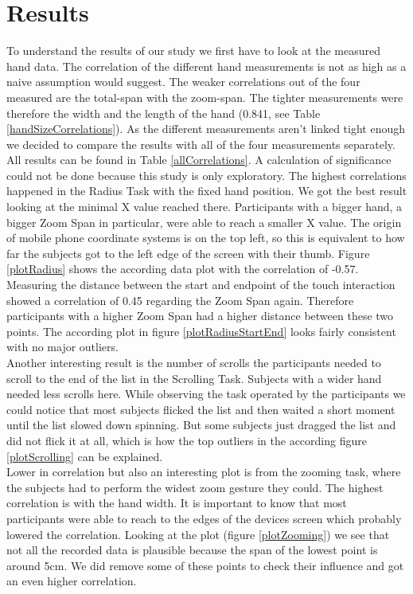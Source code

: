 \documentclass{sigchi}
\begin{document}
\section{Results}
To understand the results of our study we first have to look at the measured hand data. The correlation of the different hand measurements is not as high as a naive assumption would suggest. The weaker correlations out of the four measured are the total-span with the zoom-span. The tighter measurements were therefore the width and the length of the hand (0.841, see Table \ref{handSizeCorrelations}). As the different measurements aren't linked tight enough we decided to compare the results with all of the four measurements separately. All results can be found in Table \ref{allCorrelations}. A calculation of significance could not be done because this study is only exploratory. The highest correlations happened in the Radius Task with the fixed hand position. We got the best result looking at the minimal X value reached there. Participants with a bigger hand, a bigger Zoom Span in particular, were able to reach a smaller X value. The origin of mobile phone coordinate systems is on the top left, so this is equivalent to how far the subjects got to the left edge of the screen with their thumb. Figure \ref{plotRadius} shows the according data plot with the correlation of -0.57. Measuring the distance between the start and endpoint of the touch interaction showed a correlation of 0.45 regarding the Zoom Span again. Therefore participants with a higher Zoom Span had a higher distance between these two points. The according plot in figure \ref{plotRadiusStartEnd} looks fairly consistent with no major outliers.\\
Another interesting result is the number of scrolls the participants needed to scroll to the end of the list in the Scrolling Task. Subjects with a wider hand needed less scrolls here. While observing the task operated by the participants we could notice that most subjects flicked the list and then waited a short moment until the list slowed down spinning. But some subjects just dragged the list and did not flick it at all, which is how the top outliers in the according figure \ref{plotScrolling} can be explained.\\
Lower in correlation but also an interesting plot is from the zooming task, where the subjects had to perform the widest zoom gesture they could. The highest correlation is with the hand width. It is important to know that most participants were able to reach to the edges of the devices screen which probably lowered the correlation. Looking at the plot (figure \ref{plotZooming}) we see that not all the recorded data is plausible because the span of the lowest point is around 5cm. We did remove some of these points to check their influence and got an even higher correlation.\\
\end{document}
